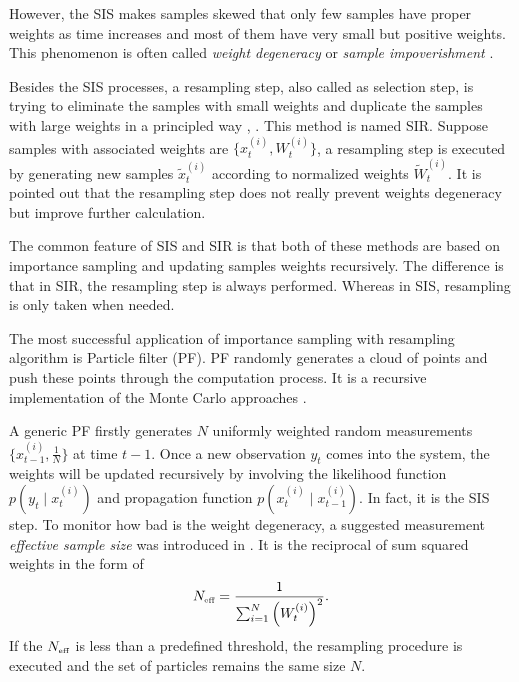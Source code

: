 However, the SIS makes samples skewed that only few samples have proper weights as time increases and most of them have very small but positive weights. This phenomenon is often called \textit{weight degeneracy} or \textit{sample impoverishment} \cite{green1995reversible} \cite{berzuini1997dynamic}. 


Besides the SIS processes, a resampling step, also called as selection step, is trying to eliminate the samples with small weights and duplicate the samples with large weights in a principled way \cite{rubin2004multiple}, \cite{tanner1987calculation}. This method is named SIR. Suppose samples with associated weights are $\{x_t^{(i)},W_t^{(i)}\}$, a resampling step is executed by generating new samples $\tilde{x}_t^{(i)}$ according to normalized weights $\tilde{W}_t^{(i)}$. It is pointed out that the resampling step does not really prevent weights degeneracy but improve further calculation. 

The common feature of SIS and SIR is that both of these methods are based on importance sampling and updating samples weights recursively. The difference is that in SIR, the resampling step is always performed. Whereas in SIS, resampling is only taken when needed. 


The most successful application of importance sampling with resampling algorithm is Particle filter (PF). PF randomly generates a cloud of points and push these points through the computation process. It is a recursive implementation of the Monte Carlo approaches \cite{doucet2009tutorial}. 


A generic PF firstly generates $N$ uniformly weighted random measurements $\{x_{t-1}^{(i)},\frac{1}{N} \}$ at time $t-1$. Once a new observation $y_t$ comes into the system, the weights will be updated recursively by involving the likelihood function $p(y_t\mid x_t^{(i)})$ and propagation function $p(x_t^{(i)}\mid x_{t-1}^{(i)})$. In fact, it is the SIS step. To monitor how bad is the weight degeneracy, a suggested measurement \textit{effective sample size} was introduced in \cite{kong1994sequential}. It is the reciprocal of sum squared weights in the form of 
\begin{equation*}
N_{\mbox{\tiny eff}} = \frac{1}{\sum_{i=1}^{N}\left(W_t^{(i)} \right)^2}. 
\end{equation*}
If the $N_{\mbox{\tiny eff}}$ is less than a predefined threshold, the resampling procedure is executed and the set of particles remains the same size $N$. 



